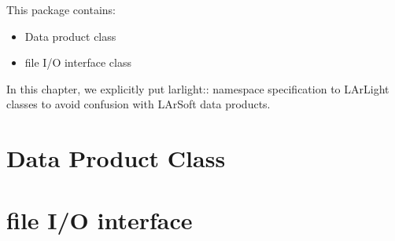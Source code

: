 
This package contains:
\begin{itemize}
\item Data product class
\item \ROOT file I/O interface class
\end{itemize}
In this chapter, we explicitly put {\ttfamily larlight::} namespace specification to LArLight classes to avoid confusion with LArSoft data products.

\section{Data Product Class}
\label{sec:dataproduct}


\section{\ROOT file I/O interface}
\label{sec:io}

